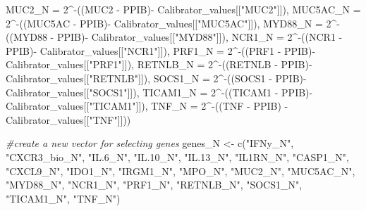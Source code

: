 \documentclass[
]{article}
\newenvironment{Shaded}{\begin{snugshade}}{\end{snugshade}}
\newcommand{\AttributeTok}[1]{\textcolor[rgb]{0.77,0.63,0.00}{#1}}
\newcommand{\CommentTok}[1]{\textcolor[rgb]{0.56,0.35,0.01}{\textit{#1}}}
\newcommand{\DecValTok}[1]{\textcolor[rgb]{0.00,0.00,0.81}{#1}}
\newcommand{\FunctionTok}[1]{\textcolor[rgb]{0.00,0.00,0.00}{#1}}
\newcommand{\NormalTok}[1]{#1}
\newcommand{\OtherTok}[1]{\textcolor[rgb]{0.56,0.35,0.01}{#1}}
\newcommand{\SpecialCharTok}[1]{\textcolor[rgb]{0.00,0.00,0.00}{#1}}
\newcommand{\StringTok}[1]{\textcolor[rgb]{0.31,0.60,0.02}{#1}}
\begin{document}
\begin{Shaded}
\begin{Highlighting}[]
                \AttributeTok{MUC2\_N =} \DecValTok{2}\SpecialCharTok{\^{}{-}}\NormalTok{((MUC2 }\SpecialCharTok{{-}}\NormalTok{ PPIB)}\SpecialCharTok{{-}}\NormalTok{ Calibrator\_values[[}\StringTok{"MUC2"}\NormalTok{]]),}
                \AttributeTok{MUC5AC\_N =} \DecValTok{2}\SpecialCharTok{\^{}{-}}\NormalTok{((MUC5AC }\SpecialCharTok{{-}}\NormalTok{ PPIB)}\SpecialCharTok{{-}}\NormalTok{ Calibrator\_values[[}\StringTok{"MUC5AC"}\NormalTok{]]),}
                \AttributeTok{MYD88\_N  =} \DecValTok{2}\SpecialCharTok{\^{}{-}}\NormalTok{((MYD88 }\SpecialCharTok{{-}}\NormalTok{ PPIB)}\SpecialCharTok{{-}}\NormalTok{ Calibrator\_values[[}\StringTok{"MYD88"}\NormalTok{]]),}
                \AttributeTok{NCR1\_N  =} \DecValTok{2}\SpecialCharTok{\^{}{-}}\NormalTok{((NCR1 }\SpecialCharTok{{-}}\NormalTok{ PPIB)}\SpecialCharTok{{-}}\NormalTok{ Calibrator\_values[[}\StringTok{"NCR1"}\NormalTok{]]),}
                \AttributeTok{PRF1\_N =} \DecValTok{2}\SpecialCharTok{\^{}{-}}\NormalTok{((PRF1 }\SpecialCharTok{{-}}\NormalTok{ PPIB)}\SpecialCharTok{{-}}\NormalTok{ Calibrator\_values[[}\StringTok{"PRF1"}\NormalTok{]]),}
                \AttributeTok{RETNLB\_N =}  \DecValTok{2}\SpecialCharTok{\^{}{-}}\NormalTok{((RETNLB }\SpecialCharTok{{-}}\NormalTok{ PPIB)}\SpecialCharTok{{-}}\NormalTok{ Calibrator\_values[[}\StringTok{"RETNLB"}\NormalTok{]]),}
                \AttributeTok{SOCS1\_N =} \DecValTok{2}\SpecialCharTok{\^{}{-}}\NormalTok{((SOCS1 }\SpecialCharTok{{-}}\NormalTok{ PPIB)}\SpecialCharTok{{-}}\NormalTok{ Calibrator\_values[[}\StringTok{"SOCS1"}\NormalTok{]]),}
                \AttributeTok{TICAM1\_N  =} \DecValTok{2}\SpecialCharTok{\^{}{-}}\NormalTok{((TICAM1 }\SpecialCharTok{{-}}\NormalTok{ PPIB)}\SpecialCharTok{{-}}\NormalTok{ Calibrator\_values[[}\StringTok{"TICAM1"}\NormalTok{]]),}
                \AttributeTok{TNF\_N =} \DecValTok{2}\SpecialCharTok{\^{}{-}}\NormalTok{((TNF }\SpecialCharTok{{-}}\NormalTok{ PPIB) }\SpecialCharTok{{-}}\NormalTok{ Calibrator\_values[[}\StringTok{"TNF"}\NormalTok{]]))}
           

\CommentTok{\#create a new vector for selecting genes}
\NormalTok{genes\_N }\OtherTok{\textless{}{-}} \FunctionTok{c}\NormalTok{(}\StringTok{"IFNy\_N"}\NormalTok{, }\StringTok{"CXCR3\_bio\_N"}\NormalTok{, }\StringTok{"IL.6\_N"}\NormalTok{, }\StringTok{"IL.10\_N"}\NormalTok{, }\StringTok{"IL.13\_N"}\NormalTok{, }\StringTok{"IL1RN\_N"}\NormalTok{, }
           \StringTok{"CASP1\_N"}\NormalTok{, }\StringTok{"CXCL9\_N"}\NormalTok{, }\StringTok{"IDO1\_N"}\NormalTok{, }\StringTok{"IRGM1\_N"}\NormalTok{, }\StringTok{"MPO\_N"}\NormalTok{, }\StringTok{"MUC2\_N"}\NormalTok{, }\StringTok{"MUC5AC\_N"}\NormalTok{, }\StringTok{"MYD88\_N"}\NormalTok{, }
           \StringTok{"NCR1\_N"}\NormalTok{, }\StringTok{"PRF1\_N"}\NormalTok{, }\StringTok{"RETNLB\_N"}\NormalTok{, }\StringTok{"SOCS1\_N"}\NormalTok{, }\StringTok{"TICAM1\_N"}\NormalTok{, }\StringTok{"TNF\_N"}\NormalTok{)}



\end{Highlighting}
\end{Shaded}
\end{document}
